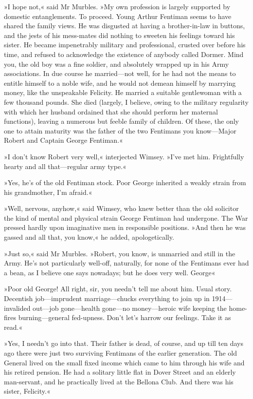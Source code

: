 »I hope not,« said Mr Murbles. »My own profession is largely supported by domestic entanglements. To proceed. Young Arthur Fentiman seems to have shared the family views. He was disgusted at having a brother-in-law in buttons, and the jests of his mess-mates did nothing to sweeten his feelings toward his sister. He became impenetrably military and professional, crusted over before his time, and refused to acknowledge the existence of anybody called Dormer. Mind you, the old boy was a fine soldier, and absolutely wrapped up in his Army associations. In due course he married—not well, for he had not the means to entitle himself to a noble wife, and he would not demean himself by marrying money, like the unspeakable Felicity. He married a suitable gentlewoman with a few thousand pounds. She died (largely, I believe, owing to the military regularity with which her husband ordained that she should perform her maternal functions), leaving a numerous but feeble family of children. Of these, the only one to attain maturity was the father of the two Fentimans you know—Major Robert and Captain George Fentiman.«

»I don't know Robert very well,« interjected Wimsey. »I've met him. Frightfully hearty and all that—regular army type.«

»Yes, he's of the old Fentiman stock. Poor George inherited a weakly strain from his grandmother, I'm afraid.«

»Well, nervous, anyhow,« said Wimsey, who knew better than the old solicitor the kind of mental and physical strain George Fentiman had undergone. The War pressed hardly upon imaginative men in responsible positions. »And then he was gassed and all that, you know,« he added, apologetically.

»Just so,« said Mr Murbles. »Robert, you know, is unmarried and still in the Army. He's not particularly well-off, naturally, for none of the Fentimans ever had a bean, as I believe one says nowadays; but he does very well. George\longdash«

»Poor old George! All right, sir, you needn't tell me about him. Usual story. Decentish job—imprudent marriage—chucks everything to join up in 1914—invalided out—job gone—health gone—no money—heroic wife keeping the home-fires burning—general fed-upness. Don't let's harrow our feelings. Take it as read.«

»Yes, I needn't go into that. Their father is dead, of course, and up till ten days ago there were just two surviving Fentimans of the earlier generation. The old General lived on the small fixed income which came to him through his wife and his retired pension. He had a solitary little flat in Dover Street and an elderly man-servant, and he practically lived at the Bellona Club. And there was his sister, Felicity.«

